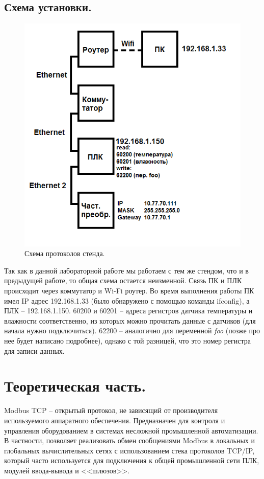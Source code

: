 \documentclass[a4paper, 12pt]{article}
\begin{document}
    \subsection{Схема установки.}
    \begin{figure}[H]
        \centering
        \includegraphics[scale=0.5]{scheme3.png}
        \captionsetup{skip=0pt}
        \caption{Схема протоколов стенда.}
        \label{fig:scheme}
    \end{figure}
    Так как в данной лабораторной работе мы работаем с тем же стендом, что и в предыдущей работе, то
    общая схема остается неизменной. Связь ПК и ПЛК происходит через коммутатор и Wi-Fi роутер. Во время
    выполнения работы ПК имел IP адрес 192.168.1.33 (было обнаружено с помощью команды ifconfig), а ПЛК --
    192.168.1.150. 60200 и 60201 -- адреса регистров датчика температуры и влажности соответственно, из которых можно прочитать
    данные с датчиков (для начала нужно подключиться). 62200 -- аналогично для переменной \textit{foo} (позже
    про нее будет написано подробнее), однако с той разницей, что это номер регистра для записи данных.


    \section{Теоретическая часть.}
    Modbus TCP -- открытый протокол, не зависящий от производителя используемого аппаратного обеспечения.
    Предназначен для контроля и управления оборудованием в системах несложной промышленной автоматизации.
    В частности, позволяет реализовать обмен сообщениями Modbus в локальных и глобальных вычислительных сетях
    с использованием стека протоколов TCP/IP, который часто используется для подключения к общей промышленной
    сети ПЛК, модулей ввода-вывода и <<шлюзов>>.
\end{document}
